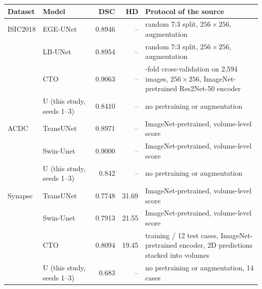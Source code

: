 \begin{tabular}{@{}llrr>{\raggedright\arraybackslash}p{5.6cm}@{}}
\toprule
Dataset & Model & DSC & HD\tnote{a} & Protocol of the source \\
\midrule
ISIC2018 & EGE-UNet \citep{Ruan2023EGEUNet} & 0.8946 & -- & random 7:3 split, $256\times256$, augmentation \\
 & LB-UNet \citep{Xu2024LBUNet} & 0.8954 & -- & random 7:3 split, $256\times256$, augmentation \\
 & CTO \citep{Lin2025Rethinking} & 0.9063 & -- & 5-fold cross-validation on 2,594 images, $256\times256$, ImageNet-pretrained Res2Net-50 encoder \\
 & U (this study, seeds 1--3)\tnote{b} & 0.8410 & -- & no pretraining or augmentation \\
\addlinespace
ACDC & TransUNet \citep{Chen2021TransUNetArxiv} & 0.8971 & -- & ImageNet-pretrained, volume-level score \\
 & Swin-Unet \citep{Cao2022SwinUnet} & 0.9000 & -- & ImageNet-pretrained, volume-level score \\
 & U (this study, seeds 1--3)\tnote{c} & 0.842 & -- & no pretraining or augmentation \\
\addlinespace
Synapse & TransUNet \citep{Chen2021TransUNetArxiv} & 0.7748 & 31.69 & ImageNet-pretrained, volume-level score \\
 & Swin-Unet \citep{Cao2022SwinUnet} & 0.7913 & 21.55 & ImageNet-pretrained, volume-level score \\
 & CTO \citep{Lin2025Rethinking} & 0.8094 & 19.45 & 18 training / 12 test cases, ImageNet-pretrained encoder, 2D predictions stacked into volumes \\
 & U (this study, seeds 1--3)\tnote{c} & 0.683 & -- & no pretraining or augmentation, 14 cases \\
\bottomrule
\end{tabular}
